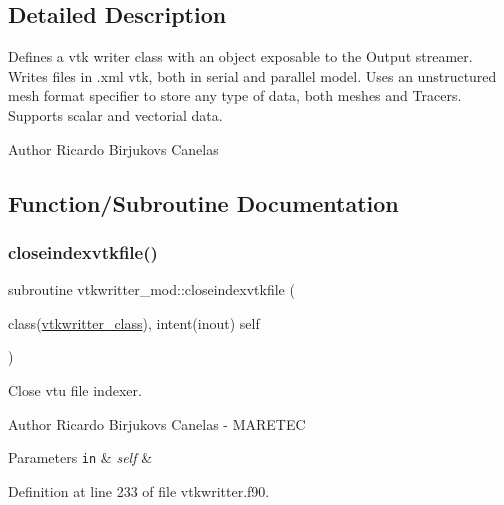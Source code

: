 \subsection{Detailed Description}
Defines a vtk writer class with an object exposable to the Output streamer. Writes files in .xml vtk, both in serial and parallel model. Uses an unstructured mesh format specifier to store any type of data, both meshes and Tracers. Supports scalar and vectorial data. 

\begin{DoxyAuthor}{Author}
Ricardo Birjukovs Canelas 
\end{DoxyAuthor}


\subsection{Function/\+Subroutine Documentation}
\mbox{\label{namespacevtkwritter__mod_a6f9a731d9dee5651f85d4aeed3f3ea5d}} 
\subsubsection{\texorpdfstring{closeindexvtkfile()}{closeindexvtkfile()}}
{\footnotesize\ttfamily subroutine vtkwritter\+\_\+mod\+::closeindexvtkfile (\begin{DoxyParamCaption}\item[{class(\mbox{\hyperlink{structvtkwritter__mod_1_1vtkwritter__class}{vtkwritter\+\_\+class}}), intent(inout)}]{self }\end{DoxyParamCaption})\hspace{0.3cm}{\ttfamily [private]}}



Close vtu file indexer. 

\begin{DoxyAuthor}{Author}
Ricardo Birjukovs Canelas -\/ M\+A\+R\+E\+T\+EC 
\end{DoxyAuthor}

\begin{DoxyParams}[1]{Parameters}
\mbox{\tt in}  & {\em self} & \\
\hline
\end{DoxyParams}


Definition at line 233 of file vtkwritter.\+f90.


